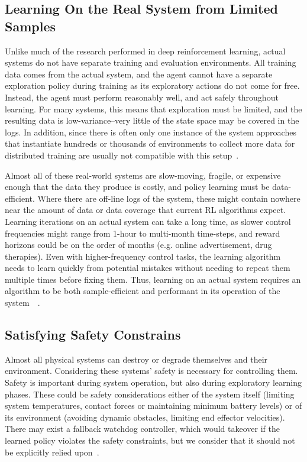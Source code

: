 \documentclass[letterpaper, 10 pt]{IEEEconf}
\begin{document}
\subsection{Learning On the Real System from Limited Samples}

Unlike much of the research performed in deep reinforcement learning,
actual systems do not have separate training and evaluation
environments. All training data comes from the actual system, and the
agent cannot have a separate exploration policy during training as its
exploratory actions do not come for free. Instead, the agent must
perform reasonably well, and act safely throughout learning. For many
systems, this means that exploration must be limited, and the
resulting data is low-variance–very little of the state space may be
covered in the logs. In addition, since there is often only one
instance of the system approaches that instantiate hundreds or
thousands of environments to collect more data for distributed
training are usually not compatible with this setup~\cite{deepmind2019}.

Almost all of these real-world systems are slow-moving, fragile, or
expensive enough that the data they produce is costly, and policy
learning must be data-efficient. Where there are off-line logs of the
system, these might contain nowhere near the amount of data or data
coverage that current RL algorithms expect. Learning iterations on an
actual system can take a long time, as slower control frequencies
might range from 1-hour to multi-month time-steps, and reward horizons
could be on the order of months (e.g. online advertisement, drug
therapies). Even with higher-frequency control tasks, the learning
algorithm needs to learn quickly from potential mistakes without
needing to repeat them multiple times before fixing them. Thus,
learning on an actual system requires an algorithm to be both
sample-efficient and performant in its operation of the system~\cite{deepmind2019}~\cite{microsoft_research_2018}.

\subsection{Satisfying Safety Constrains}

Almost all physical systems can destroy or degrade themselves and
their environment. Considering these systems’ safety is necessary for
controlling them. Safety is important during system operation, but
also during exploratory learning phases. These could be safety
considerations either of the system itself (limiting system
temperatures, contact forces or maintaining minimum battery levels) or
of its environment (avoiding dynamic obstacles, limiting end effector
velocities). There may exist a fallback watchdog controller, which
would takeover if the learned policy violates the safety constraints,
but we consider that it should not be explicitly relied
upon~\cite{deepmind2019}.
\end{document}
